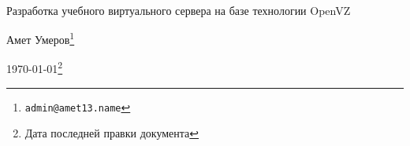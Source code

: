 
{~}\bigskip %

\begin{center}
\Huge{Разработка учебного виртуального сервера на базе технологии OpenVZ} %

\vspace{1em}
\Large{Амет Умеров}\footnote{\texttt{admin@amet13.name}} %

\Large{\today}\footnote{Дата последней правки документа} %
\end{center}

\clearpage %

